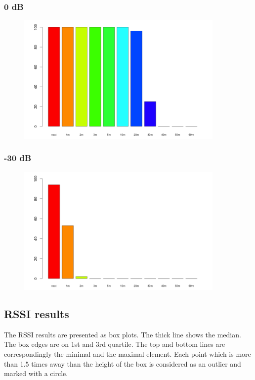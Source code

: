 \subsubsection{0 dB}

\begin{figure}[H]
  \centering
  \includegraphics[width=0.9\textwidth]{img/tests/range/db_00.png}
\end{figure}

\subsubsection{-30 dB}

\begin{figure}[H]
  \centering
  \includegraphics[width=0.9\textwidth]{img/tests/range/db_m30.png}
\end{figure}

\subsection{RSSI results}


The RSSI results are presented as box plots.
The thick line shows the median.
The box edges are on 1st and 3rd quartile.
The top and bottom lines are correspondingly the minimal and the maximal element.
Each point which is more than 1.5 times away than the height of the box is considered as an outlier and marked with a circle.

